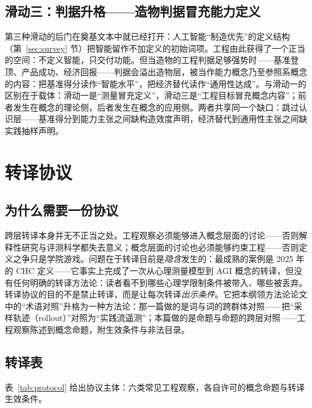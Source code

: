 \documentclass[10pt,fontset=fandol]{ctexart}
\begin{document}
\subsection{滑动三：判据升格——造物判据冒充能力定义}

第三种滑动的后门在奠基文本中就已经打开：人工智能“制造优先”的定义结构（第~\ref{sec:survey} 节）把智能留作不加定义的初始词项。工程由此获得了一个正当的空间：不定义智能，只交付功能。但当造物的工程判据足够强势时——基准登顶、产品成功、经济回报——判据会溢出造物层，被当作能力概念乃至参照系概念的内容：把基准得分读作“智能水平”，把经济替代读作“通用性达成”\cite{openai2018charter}。与滑动一的区别在于载体：滑动一是“测量冒充定义”，滑动三是“工程目标冒充概念内容”；前者发生在概念的理论侧，后者发生在概念的应用侧。两者共享同一个缺口：跳过认识层——基准得分到能力主张之间缺构造效度声明\cite{raji2021benchmark,bean2025measuring}，经济替代到通用性主张之间缺实践抽样声明\cite{yu2026theory}。

\section{转译协议}\label{sec:protocol}

\subsection{为什么需要一份协议}

跨层转译本身并无不正当之处。工程观察必须能够进入概念层面的讨论——否则解释性研究与评测科学都失去意义；概念层面的讨论也必须能够约束工程——否则定义之争只是学院游戏。问题在于转译目前是\emph{隐含}发生的：最成熟的案例是 2025 年的 CHC 定义\cite{hendrycks2025definition}——它事实上完成了一次从心理测量模型到 AGI 概念的转译，但没有任何明确的转译方法论：读者看不到哪些心理学限制条件被带入、哪些被丢弃。转译协议的目的不是禁止转译，而是让每次转译\emph{出示条件}。它把本纲领方法论论文中的“术语对照”升格为一种方法论：那一篇做的是词与词的跨群体对照——把“采样轨迹（rollout）”对照为“实践流遥测”\cite{yu2026methodology}；本篇做的是命题与命题的跨层对照——工程观察陈述到概念命题，附生效条件与非法目录。

\subsection{转译表}

表~\ref{tab:protocol} 给出协议主体：六类常见工程观察，各自许可的概念命题与转译生效条件。
\end{document}
